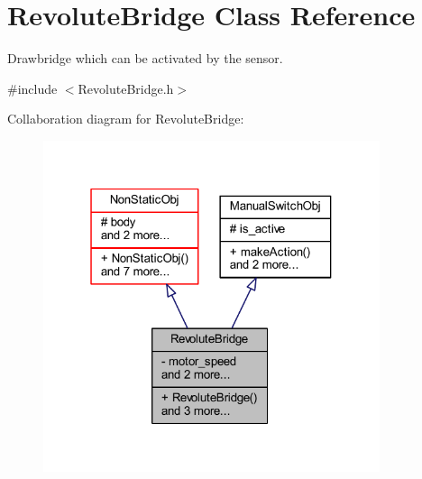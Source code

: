 \hypertarget{class_revolute_bridge}{}\section{Revolute\+Bridge Class Reference}
\label{class_revolute_bridge}


Drawbridge which can be activated by the sensor.  




{\ttfamily \#include $<$Revolute\+Bridge.\+h$>$}



Collaboration diagram for Revolute\+Bridge\+:\nopagebreak
\begin{figure}[H]
\begin{center}
\leavevmode
\includegraphics[width=280pt]{class_revolute_bridge__coll__graph}
\end{center}
\end{figure}
